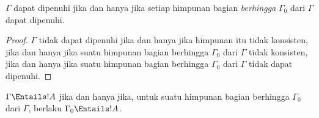 \documentclass[../../../include/open-logic-section]{subfiles}
\begin{document}
\begin{prop}
$\Gamma$ dapat dipenuhi jika dan hanya jika setiap himpunan bagian
\emph{berhingga} $\Gamma_0$ dari $\Gamma$ dapat dipenuhi.
\end{prop}

\begin{proof}
$\Gamma$ tidak dapat dipenuhi jika dan hanya jika himpunan itu tidak konsisten,
jika dan hanya jika suatu himpunan bagian berhingga $\Gamma_0$ dari $\Gamma$
tidak konsisten, jika dan hanya jika suatu himpunan bagian berhingga
$\Gamma_0$ dari $\Gamma$ tidak dapat dipenuhi.
\end{proof}

\begin{cor}
$\Gamma \Entails !A$ jika dan hanya jika, untuk suatu himpunan bagian
berhingga $\Gamma_0$ dari $\Gamma$, berlaku $\Gamma_0 \Entails !A$.
\end{cor}
\end{document}
